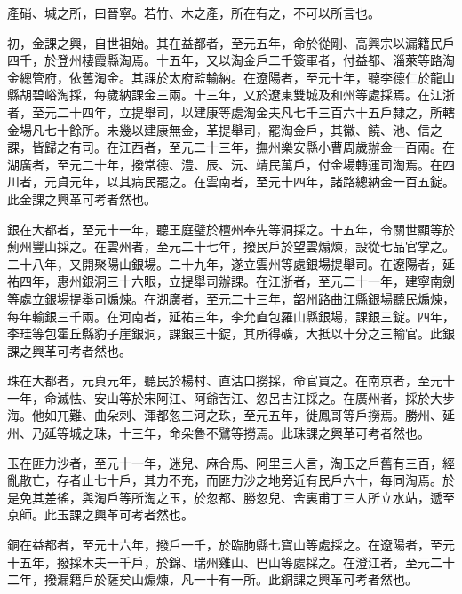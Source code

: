 \begin{pinyinscope}
 產硝、堿之所，曰晉寧。若竹、木之產，所在有之，不可以所言也。



 初，金課之興，自世祖始。其在益都者，至元五年，命於從剛、高興宗以漏籍民戶四千，於登州棲霞縣淘焉。十五年，又以淘金戶二千簽軍者，付益都、淄萊等路淘金總管府，依舊淘金。其課於太府監輸納。在遼陽者，至元十年，聽李德仁於龍山縣胡碧峪淘採，每歲納課金三兩。十三年，又於遼東雙城及和州等處採焉。在江浙者，至元二十四年，立提舉司，以建康等處淘金夫凡七千三百六十五戶隸之，所轄金場凡七十餘所。未幾以建康無金，革提舉司，罷淘金戶，其徽、饒、池、信之課，皆歸之有司。在江西者，至元二十三年，撫州樂安縣小曹周歲辦金一百兩。在湖廣者，至元二十年，撥常德、澧、辰、沅、靖民萬戶，付金場轉運司淘焉。在四川者，元貞元年，以其病民罷之。在雲南者，至元十四年，諸路總納金一百五錠。此金課之興革可考者然也。



 銀在大都者，至元十一年，聽王庭璧於檀州奉先等洞採之。十五年，令關世顯等於薊州豐山採之。在雲州者，至元二十七年，撥民戶於望雲煽煉，設從七品官掌之。二十八年，又開聚陽山銀場。二十九年，遂立雲州等處銀場提舉司。在遼陽者，延祐四年，惠州銀洞三十六眼，立提舉司辦課。在江浙者，至元二十一年，建寧南劍等處立銀場提舉司煽煉。在湖廣者，至元二十三年，韶州路曲江縣銀場聽民煽煉，每年輸銀三千兩。在河南者，延祐三年，李允直包羅山縣銀場，課銀三錠。四年，李珪等包霍丘縣豹子崖銀洞，課銀三十錠，其所得礦，大抵以十分之三輸官。此銀課之興革可考者然也。



 珠在大都者，元貞元年，聽民於楊村、直沽口撈採，命官買之。在南京者，至元十一年，命滅怯、安山等於宋阿江、阿爺苦江、忽呂古江採之。在廣州者，採於大步海。他如兀難、曲朵剌、渾都忽三河之珠，至元五年，徙鳳哥等戶撈焉。勝州、延州、乃延等城之珠，十三年，命朵魯不鷿等撈焉。此珠課之興革可考者然也。



 玉在匪力沙者，至元十一年，迷兒、麻合馬、阿里三人言，淘玉之戶舊有三百，經亂散亡，存者止七十戶，其力不充，而匪力沙之地旁近有民戶六十，每同淘焉。於是免其差徭，與淘戶等所淘之玉，於忽都、勝忽兒、舍裏甫丁三人所立水站，遞至京師。此玉課之興革可考者然也。



 銅在益都者，至元十六年，撥戶一千，於臨朐縣七寶山等處採之。在遼陽者，至元十五年，撥採木夫一千戶，於錦、瑞州雞山、巴山等處採之。在澄江者，至元二十二年，撥漏籍戶於薩矣山煽煉，凡一十有一所。此銅課之興革可考者然也。




\end{pinyinscope}
